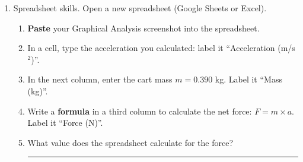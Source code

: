 \documentclass[12pt, twoside]{article}
\begin{document}
\begin{enumerate}[itemsep=0.5cm]
  \begin{enumerate}[itemsep=1.5cm]
    \item Create a graph of Position vs.\ Time. Label the axes and give the graph a title.
    \item Apply a \textbf{quadratic curve fit} to the data. Write the equation and the values of the fit parameters $A$, $B$, and $C$ below.
    \vspace{1cm}
    \item Recall: for constant acceleration, $x = \frac{1}{2}at^2 + v_0 t + x_0$. Using the value of $A$ from your fit, calculate the acceleration $a$.
    \vfill
    \item Save the .gambl file to the shared Google Drive folder. Include your name in the file name. You will take a \textbf{screenshot} of your graph with the curve fit displayed for the next problem.
  \end{enumerate}
  \vspace{0.5cm}

\newpage
\item Spreadsheet skills. Open a new spreadsheet (Google Sheets or Excel).
  \begin{enumerate}[itemsep=0.75cm]
    \item \textbf{Paste} your Graphical Analysis screenshot into the spreadsheet.
    \item In a cell, type the acceleration you calculated: label it ``Acceleration (m/s$^2$)''.
    \item In the next column, enter the cart mass $m = 0.390$ kg. Label it ``Mass (kg)''.
    \item Write a \textbf{formula} in a third column to calculate the net force: $F = m \times a$. Label it ``Force (N)''.
    \item What value does the spreadsheet calculate for the force? \rule{3cm}{0.4pt}
  \end{enumerate}

\end{enumerate}
\end{document}
